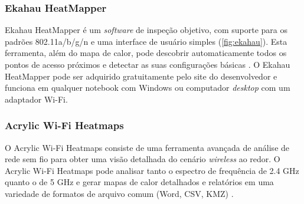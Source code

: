 \subsubsection{Ekahau HeatMapper}
\label{subsubsec:ekahau}

Ekahau HeatMapper é um \textit{software} de inspeção objetivo, com suporte para os padrões 802.11a/b/g/n e uma interface de usuário simples (\autoref{fig:ekahau}). Esta ferramenta, além do mapa de calor, pode descobrir automaticamente todos os pontos de acesso próximos e detectar as suas configurações básicas \cite{Ekahau2019}. O Ekahau HeatMapper pode ser adquirido gratuitamente pelo site do desenvolvedor e funciona em qualquer notebook com Windows ou computador \textit{desktop} com um adaptador Wi-Fi.

\begin{figure}[H]
	\centering
\end{figure}

\subsubsection{Acrylic Wi-Fi Heatmaps}
\label{subsubsec:acrylic-wifi-heatmaps}

O Acrylic Wi-Fi Heatmaps consiste de uma ferramenta avançada de análise de rede sem fio para obter uma visão detalhada do cenário \textit{wireless} ao redor. O Acrylic Wi-Fi Heatmaps pode analisar tanto o espectro de frequência de 2.4 GHz quanto o de 5 GHz e gerar mapas de calor detalhados e relatórios em uma variedade de formatos de arquivo comum (Word, CSV, KMZ) \cite{Netspot2019}. 

